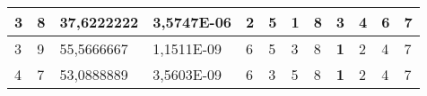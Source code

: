 \documentclass[conference]{IEEEtran}
\begin{document}
\begin{table*}[]
\begin{tabular}{|llll|llllllll|}
\multicolumn{1}{|l|}{3}                                                     & \multicolumn{1}{l|}{8}                                                        & \multicolumn{1}{l|}{37,6222222}                                                   & 3,5747E-06                     & \multicolumn{1}{l|}{2}                                                  & \multicolumn{1}{l|}{5}                                                  & \multicolumn{1}{l|}{\textbf{1}}                                         & \multicolumn{1}{l|}{8}                                                  & \multicolumn{1}{l|}{3}                                                  & \multicolumn{1}{l|}{4}                                                  & \multicolumn{1}{l|}{6}                                                  & 7                          \\ \hline
\multicolumn{1}{|l|}{3}                                                     & \multicolumn{1}{l|}{9}                                                        & \multicolumn{1}{l|}{55,5666667}                                                   & 1,1511E-09                     & \multicolumn{1}{l|}{6}                                                  & \multicolumn{1}{l|}{5}                                                  & \multicolumn{1}{l|}{3}                                                  & \multicolumn{1}{l|}{8}                                                  & \multicolumn{1}{l|}{\textbf{1}}                                         & \multicolumn{1}{l|}{2}                                                  & \multicolumn{1}{l|}{4}                                                  & 7                          \\ \hline
\multicolumn{1}{|l|}{4}                                                     & \multicolumn{1}{l|}{7}                                                        & \multicolumn{1}{l|}{53,0888889}                                                   & 3,5603E-09                     & \multicolumn{1}{l|}{6}                                                  & \multicolumn{1}{l|}{3}                                                  & \multicolumn{1}{l|}{5}                                                  & \multicolumn{1}{l|}{8}                                                  & \multicolumn{1}{l|}{\textbf{1}}                                         & \multicolumn{1}{l|}{2}                                                  & \multicolumn{1}{l|}{4}                                                  & 7                          \\ \hline

\end{tabular}
\end{table*}
\end{document}
